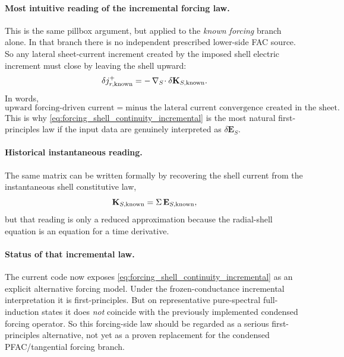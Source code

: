 \documentclass[11pt,a4paper]{article}
\begin{document}
\paragraph{Most intuitive reading of the incremental forcing law.}
This is the same pillbox argument, but applied to the \emph{known forcing}
branch alone. In that branch there is no independent prescribed lower-side FAC
source. So any lateral sheet-current increment created by the imposed shell
electric increment must close by leaving the shell upward:
\[
\delta j_{r,\rm known}^+
=
-\,\nabla_S\!\cdot \delta\mathbf K_{S,\rm known}.
\]
In words,
\[
\text{upward forcing-driven current}
=
\text{minus the lateral current convergence created in the sheet}.
\]
This is why \eqref{eq:forcing_shell_continuity_incremental} is the most
natural first-principles law if the input data are genuinely interpreted as
\(\delta\mathbf E_S\).

\paragraph{Historical instantaneous reading.}
The same matrix can be written formally by recovering the shell current from the
instantaneous shell constitutive law,
\[
\mathbf K_{S,\rm known} = \Sigma\,\mathbf E_{S,\rm known},
\]
but that reading is only a reduced approximation because the radial-shell
equation is an equation for a time derivative.

\paragraph{Status of that incremental law.}
The current code now exposes \eqref{eq:forcing_shell_continuity_incremental} as
an explicit alternative forcing model. Under the frozen-conductance
incremental interpretation it is first-principles. But on representative
pure-spectral full-induction states it does \emph{not} coincide with the
previously implemented condensed forcing operator. So this forcing-side law
should be regarded as a serious first-principles alternative, not yet as a
proven replacement for the condensed PFAC/tangential forcing branch.
\end{document}
